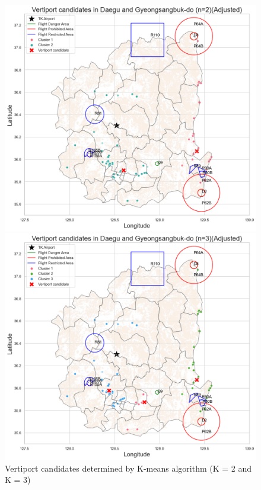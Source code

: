 \documentclass[11pt]{article}
\begin{document}
    \begin{figure}[H]
      \centering
      \begin{minipage}{0.5\textwidth}
        \centering
        \includegraphics[width=\linewidth]{figure/K2.png}
      \end{minipage}%
      \begin{minipage}{0.5\textwidth}
        \centering
        \includegraphics[width=\linewidth]{figure/K3.png}
      \end{minipage}%
      \caption{Vertiport candidates determined by K-means algorithm (K = 2 and K = 3)}
      \label{fig:overall}
    \end{figure}
\end{document}
